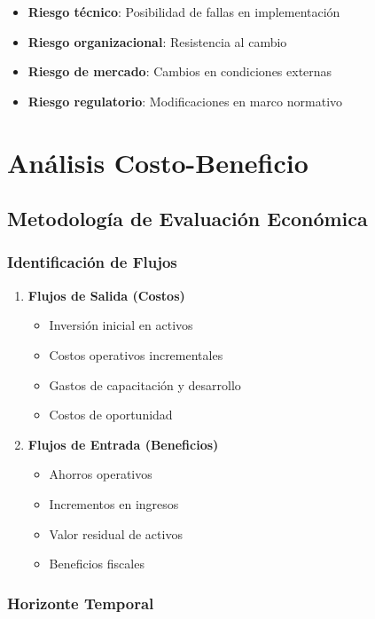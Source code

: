 \documentclass[12pt,letterpaper,oneside]{book}
\begin{document}
\begin{itemize}
\item \textbf{Riesgo técnico}: Posibilidad de fallas en implementación
\item \textbf{Riesgo organizacional}: Resistencia al cambio
\item \textbf{Riesgo de mercado}: Cambios en condiciones externas
\item \textbf{Riesgo regulatorio}: Modificaciones en marco normativo
\end{itemize}

\section{Análisis Costo-Beneficio}

\subsection{Metodología de Evaluación Económica}

\subsubsection{Identificación de Flujos}

\begin{enumerate}
\item \textbf{Flujos de Salida (Costos)}
   \begin{itemize}
   \item Inversión inicial en activos
   \item Costos operativos incrementales
   \item Gastos de capacitación y desarrollo
   \item Costos de oportunidad
   \end{itemize}

\item \textbf{Flujos de Entrada (Beneficios)}
   \begin{itemize}
   \item Ahorros operativos
   \item Incrementos en ingresos
   \item Valor residual de activos
   \item Beneficios fiscales
   \end{itemize}
\end{enumerate}

\subsubsection{Horizonte Temporal}
\end{document}
